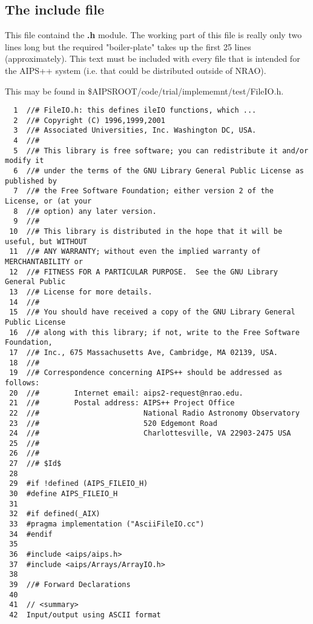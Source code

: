 \newpage
\subsection{The {\bf include} file}

        This file containd the {\bf .h} module.         The working part of
this file is really only two lines long but the required
"boiler-plate" takes up the first 25 lines (approximately). This text
must be included with every file that is intended for the AIPS++
system (i.e. that could be distributed outside of NRAO).  



\newpage

This 
may be found in \$AIPSROOT/code/trial/implememnt/test/FileIO.h.
\begin{verbatim}
  1  //# FileIO.h: this defines ileIO functions, which ...
  2  //# Copyright (C) 1996,1999,2001
  3  //# Associated Universities, Inc. Washington DC, USA.
  4  //#
  5  //# This library is free software; you can redistribute it and/or modify it
  6  //# under the terms of the GNU Library General Public License as published by
  7  //# the Free Software Foundation; either version 2 of the License, or (at your
  8  //# option) any later version.
  9  //#
 10  //# This library is distributed in the hope that it will be useful, but WITHOUT
 11  //# ANY WARRANTY; without even the implied warranty of MERCHANTABILITY or
 12  //# FITNESS FOR A PARTICULAR PURPOSE.  See the GNU Library General Public
 13  //# License for more details.
 14  //#
 15  //# You should have received a copy of the GNU Library General Public License
 16  //# along with this library; if not, write to the Free Software Foundation,
 17  //# Inc., 675 Massachusetts Ave, Cambridge, MA 02139, USA.
 18  //#
 19  //# Correspondence concerning AIPS++ should be addressed as follows:
 20  //#        Internet email: aips2-request@nrao.edu.
 21  //#        Postal address: AIPS++ Project Office
 22  //#                        National Radio Astronomy Observatory
 23  //#                        520 Edgemont Road
 24  //#                        Charlottesville, VA 22903-2475 USA
 25  //#
 26  //#
 27  //# $Id$
 28
 29  #if !defined (AIPS_FILEIO_H)
 30  #define AIPS_FILEIO_H
 31
 32  #if defined(_AIX)
 33  #pragma implementation ("AsciiFileIO.cc")
 34  #endif
 35
 36  #include <aips/aips.h>
 37  #include <aips/Arrays/ArrayIO.h>
 38
 39  //# Forward Declarations
 40
 41  // <summary>
 42  Input/output using ASCII format

\end{verbatim}
